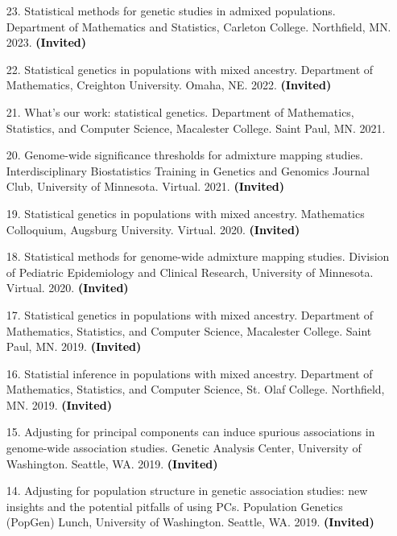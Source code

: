 \documentclass[margin]{res}
\newcommand{\annotate}[1]{\textcolor{black}{\textbf{(#1)}}}
\begin{document}
\begin{resume}
\begin{itemize}
\item[23.] Statistical methods for genetic studies in admixed populations. 
Department of Mathematics and Statistics, Carleton College. Northfield, MN. 2023. 
\annotate{Invited}

\item[22.] Statistical genetics in populations with mixed ancestry. 
Department of Mathematics, Creighton University. Omaha, NE. 2022. 
\annotate{Invited}

\item[21.] What's our work: statistical genetics. 
Department of Mathematics, Statistics, and Computer Science, Macalester College. Saint Paul, MN. 2021.

\item[20.] Genome-wide significance thresholds for admixture mapping studies.
Interdisciplinary Biostatistics Training in Genetics and Genomics Journal Club, University of Minnesota. Virtual. 2021. 
\annotate{Invited}

\item[19.] Statistical genetics in populations with mixed ancestry. 
Mathematics Colloquium, Augsburg University. Virtual. 2020. 
\annotate{Invited}

\item[18.] Statistical methods for genome-wide admixture mapping studies. 
Division of Pediatric Epidemiology and Clinical Research, University of Minnesota. Virtual. 2020. 
\annotate{Invited}

\item[17.] Statistical genetics in populations with mixed ancestry. 
Department of Mathematics, Statistics, and Computer Science, Macalester College. Saint Paul, MN. 2019. 
\annotate{Invited}

\item[16.] Statistial inference in populations with mixed ancestry. 
Department of Mathematics, Statistics, and Computer Science, St. Olaf College. Northfield, MN. 2019. 
\annotate{Invited}

\item[15.] Adjusting for principal components can induce spurious associations in genome-wide association studies. 
Genetic Analysis Center, University of Washington. Seattle, WA. 2019. 
\annotate{Invited}

\item[14.] Adjusting for population structure in genetic association studies: new insights and the potential pitfalls of using PCs. 
Population Genetics (PopGen) Lunch, University of Washington. Seattle, WA. 2019.  
\annotate{Invited}


\end{itemize}
\end{resume}
\end{document}
